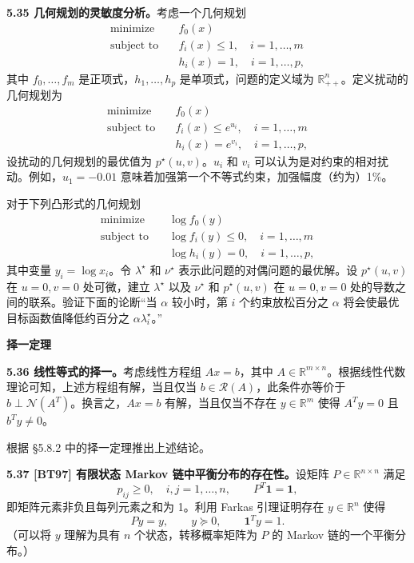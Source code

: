\documentclass[UTF8, 12pt, fontset=fandol, oneside]{ctexart}
\begin{document}
\noindent\textbf{5.35 几何规划的灵敏度分析。}\quad 考虑一个几何规划
\[
\begin{aligned}
\text{minimize}\quad & f_0(x)\\
\text{subject to}\quad & f_i(x)\leq 1,\quad i=1,\ldots,m\\
& h_i(x)=1,\quad i=1,\ldots,p,
\end{aligned}
\]
其中 $f_0,\ldots,f_m$ 是正项式，$h_1,\ldots,h_p$ 是单项式，问题的定义域为 $\mathbb{R}_{++}^n$。定义扰动的几何规划为
\[
\begin{aligned}
\text{minimize}\quad & f_0(x)\\
\text{subject to}\quad & f_i(x)\leq e^{u_i},\quad i=1,\ldots,m\\
& h_i(x)=e^{v_i},\quad i=1,\ldots,p,
\end{aligned}
\]
设扰动的几何规划的最优值为 $p^\star(u,v)$。$u_i$ 和 $v_i$ 可以认为是对约束的相对扰动。例如，$u_1=-0.01$ 意味着加强第一个不等式约束，加强幅度（约为）1\%。

对于下列凸形式的几何规划
\[
\begin{aligned}
\text{minimize}\quad & \log f_0(y)\\
\text{subject to}\quad & \log f_i(y)\leq 0,\quad i=1,\ldots,m\\
& \log h_i(y)=0,\quad i=1,\ldots,p,
\end{aligned}
\]
其中变量 $y_i=\log x_i$。令 $\lambda^\star$ 和 $\nu^\star$ 表示此问题的对偶问题的最优解。设 $p^\star(u,v)$ 在 $u=0, v=0$ 处可微，建立 $\lambda^\star$ 以及 $\nu^\star$ 和 $p^\star(u,v)$ 在 $u=0, v=0$ 处的导数之间的联系。验证下面的论断“当 $\alpha$ 较小时，第 $i$ 个约束放松百分之 $\alpha$ 将会使最优目标函数值降低约百分之 $\alpha\lambda_i^\star$。”

\noindent\textbf{择一定理}

\noindent\textbf{5.36 线性等式的择一。}\quad 考虑线性方程组 $Ax=b$，其中 $A\in\mathbb{R}^{m\times n}$。根据线性代数理论可知，上述方程组有解，当且仅当 $b\in\mathcal{R}(A)$，此条件亦等价于 $b\perp\mathcal{N}(A^T)$。换言之，$Ax=b$ 有解，当且仅当不存在 $y\in\mathbb{R}^m$ 使得 $A^Ty=0$ 且 $b^Ty\neq 0$。

根据 §5.8.2 中的择一定理推出上述结论。

\noindent\textbf{5.37 [BT97] 有限状态 Markov 链中平衡分布的存在性。}\quad 设矩阵 $P\in\mathbb{R}^{n\times n}$ 满足
\[
p_{ij}\geq 0,\quad i,j=1,\ldots,n,\qquad P^T\mathbf{1}=\mathbf{1},
\]
即矩阵元素非负且每列元素之和为 1。利用 Farkas 引理证明存在 $y\in\mathbb{R}^n$ 使得
\[
Py=y,\qquad y\succeq 0,\qquad \mathbf{1}^Ty=1.
\]
（可以将 $y$ 理解为具有 $n$ 个状态，转移概率矩阵为 $P$ 的 Markov 链的一个平衡分布。）
\end{document}
